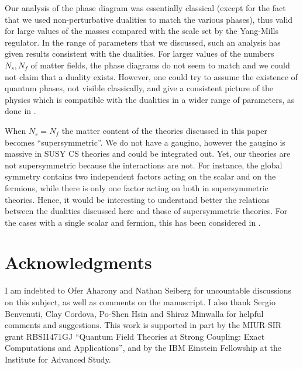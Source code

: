 \documentclass[a4paper, 12pt]{article}
\numberwithin{equation}{section}
\begin{document}
Our analysis of the phase diagram was essentially classical (except for the fact that we used non-perturbative dualities to match the various phases), thus valid for large values of the masses compared with the scale set by the Yang-Mills regulator. In the range of parameters that we discussed, such an analysis has given results consistent with the dualities. For larger values of the numbers $N_s, N_f$ of matter fields, the phase diagrams do not seem to match and we could not claim that a duality exists. However, one could try to assume the existence of quantum phases, not visible classically, and give a consistent picture of the physics which is compatible with the dualities in a wider range of parameters, as done in \cite{Komargodski:2017keh, Gaiotto:2017tne, Gomis:2017ixy}.

When $N_s = N_f$ the matter content of the theories discussed in this paper becomes ``supersymmetric''. We do not have a gaugino, however the gaugino is massive in SUSY CS theories and could be integrated out. Yet, our theories are not supersymmetric because the interactions are not. For instance, the global symmetry contains two independent factors acting on the scalar and on the fermions, while there is only one factor acting on both in supersymmetric theories. Hence, it would be interesting to understand better the relations between the dualities discussed here and those of supersymmetric theories. For the cases with a single scalar and fermion, this has been considered in \cite{Jain:2013gza, Gur-Ari:2015pca, Kachru:2016aon}.








\section*{Acknowledgments} 

I am indebted to Ofer Aharony and Nathan Seiberg for uncountable discussions on this subject, as well as comments on the manuscript. I also thank Sergio Benvenuti, Clay Cordova, Po-Shen Hsin  and Shiraz Minwalla for helpful comments and suggestions. This work is supported in part by the MIUR-SIR grant RBSI1471GJ ``Quantum Field Theories at Strong Coupling: Exact Computations and Applications'', and by the IBM Einstein Fellowship at the Institute for Advanced Study.

\appendix
\end{document}
